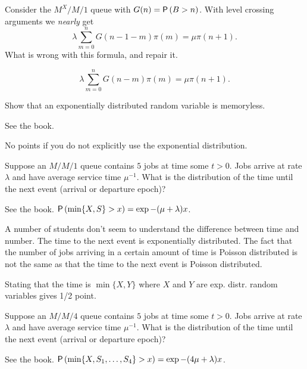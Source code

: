 \begin{exercise}[201704]{2}%
  Consider the $M^X/M/1$ queue with $G(n) = \P{B>n}$.
  With level crossing arguments we \emph{nearly} get
\begin{equation*}
\lambda  \sum_{m=0}^n G(n-1-m) \pi(m) = \mu \pi(n+1).
\end{equation*}
What is wrong with this formula, and repair it.
\begin{solution}
\begin{equation*}
\lambda  \sum_{m=0}^n G(n-m) \pi(m) = \mu \pi(n+1).
\end{equation*}
\end{solution}
\end{exercise}


\begin{exercise}[201706] Show that an  exponentially distributed random variable is memoryless.
\begin{solution}
  See the book.

No points if you do not explicitly use the exponential distribution.
\end{solution}
\end{exercise}


\begin{exercise}[201706] Suppose an $M/M/1$ queue contains $5$ jobs at time some $t>0$. Jobs arrive at rate $\lambda$ and have average service time $\mu^{-1}$. What is the distribution of the time until the next event (arrival or departure epoch)?
\begin{solution}
  See the book. $\P{\min\{X, S\} > x} = \exp{-(\mu+\lambda) x}$. 

A number of students don't seem to understand the difference between time and number. The time to the next event is exponentially distributed. The fact that the number of jobs arriving in a certain amount of time is Poisson distributed is not the same as that the time to the next event is Poisson distributed. 

Stating that the time is $\min\{X,Y\}$ where $X$ and $Y$ are exp. distr. random variables gives 1/2 point.
\end{solution}
\end{exercise}

\begin{exercise}[201706] Suppose an $M/M/4$ queue contains $5$ jobs at time some $t>0$. Jobs arrive at rate $\lambda$ and have average service time $\mu^{-1}$. What is the distribution of the time until the next event (arrival or departure epoch)?
\begin{solution}
  See the book. $\P{\min\{X, S_1,\ldots, S_4\} > x} = \exp{-(4\mu+\lambda) x}$. 
\end{solution}
\end{exercise}

